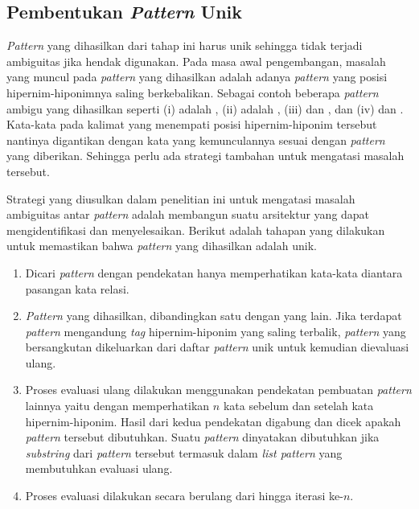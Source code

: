 \subsection{Pembentukan \textit{Pattern} Unik}
\textit{Pattern} yang dihasilkan dari tahap ini harus unik sehingga tidak terjadi ambiguitas jika hendak digunakan. Pada masa awal pengembangan, masalah yang muncul pada \textit{pattern} yang dihasilkan adalah adanya \textit{pattern} yang posisi hipernim-hiponimnya saling berkebalikan. Sebagai contoh beberapa \textit{pattern} ambigu yang dihasilkan seperti (i) {\tagHyponym} adalah {\tagHypernym}, (ii) {\tagHypernym} adalah {\tagHyponym}, (iii) {\tagHypernym} dan {\tagHyponym}, dan (iv) {\tagHyponym} dan {\tagHypernym}. Kata-kata pada kalimat yang menempati posisi hipernim-hiponim tersebut nantinya digantikan dengan kata yang kemunculannya sesuai dengan \textit{pattern} yang diberikan. Sehingga perlu ada strategi tambahan untuk mengatasi masalah tersebut.

Strategi yang diusulkan dalam penelitian ini untuk mengatasi masalah ambiguitas antar \textit{pattern} adalah membangun suatu arsitektur yang dapat mengidentifikasi dan menyelesaikan. Berikut adalah tahapan yang dilakukan untuk memastikan bahwa \textit{pattern} yang dihasilkan adalah unik.

\begin{enumerate}
  \item Dicari \textit{pattern} dengan pendekatan hanya memperhatikan kata-kata diantara pasangan kata relasi.
  \item \textit{Pattern} yang dihasilkan, dibandingkan satu dengan yang lain. Jika terdapat \textit{pattern} mengandung \textit{tag} hipernim-hiponim yang saling terbalik, \textit{pattern} yang bersangkutan dikeluarkan dari daftar \textit{pattern} unik untuk kemudian dievaluasi ulang.
  \item Proses evaluasi ulang dilakukan menggunakan pendekatan pembuatan \textit{pattern} lainnya yaitu dengan memperhatikan $n$ kata sebelum dan setelah kata hipernim-hiponim. Hasil dari kedua pendekatan digabung dan dicek apakah \textit{pattern} tersebut dibutuhkan. Suatu \textit{pattern} dinyatakan dibutuhkan jika \textit{substring} dari \textit{pattern} tersebut termasuk dalam \textit{list pattern} yang membutuhkan evaluasi ulang.
  \item Proses evaluasi dilakukan secara berulang dari hingga iterasi ke-$n$.
\end{enumerate}

